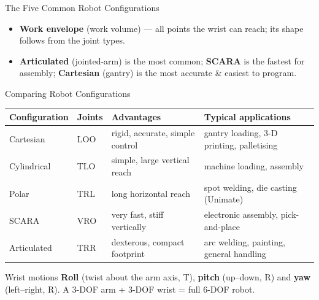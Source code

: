 \documentclass[aspectratio=169]{beamer}
\begin{document}
\begin{frame}{The Five Common Robot Configurations}
		\vspace{0.2cm}
		\begin{itemize}\small
			\item \textbf{Work envelope} (work volume) --- all points the wrist can reach; its shape follows from the joint types.
			\item \textbf{Articulated} (jointed-arm) is the most common; \textbf{SCARA} is the fastest for assembly; \textbf{Cartesian} (gantry) is the most accurate \& easiest to program.
		\end{itemize}
	\end{frame}

	\begin{frame}{Comparing Robot Configurations}
		\renewcommand{\arraystretch}{1.25}
		\centering
		\small
		\begin{tabular}{@{}>{\raggedright}p{2.4cm}>{\raggedright}p{1.4cm}>{\raggedright}p{4.0cm}>{\raggedright\arraybackslash}p{4.6cm}@{}}
			\toprule
			\textbf{Configuration} & \textbf{Joints} & \textbf{Advantages} & \textbf{Typical applications} \\
			\midrule
			Cartesian   & LOO & rigid, accurate, simple control   & gantry loading, 3-D printing, palletising \\
			Cylindrical & TLO & simple, large vertical reach      & machine loading, assembly \\
			Polar       & TRL & long horizontal reach             & spot welding, die casting (Unimate) \\
			SCARA       & VRO & very fast, stiff vertically       & electronic assembly, pick-and-place \\
			Articulated & TRR & dexterous, compact footprint      & arc welding, painting, general handling \\
			\bottomrule
		\end{tabular}
		\vspace{0.3cm}
		\begin{block}{Wrist motions}
			\small \textbf{Roll} (twist about the arm axis, T), \textbf{pitch} (up--down, R) and \textbf{yaw} (left--right, R). A 3-DOF arm + 3-DOF wrist = full 6-DOF robot.
		\end{block}
	\end{frame}
\end{document}
